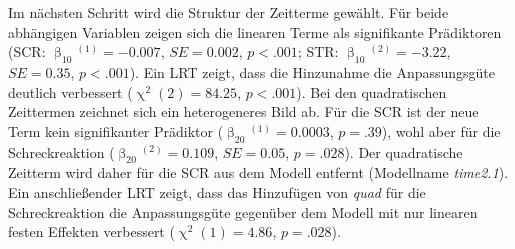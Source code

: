 		
			Im nächsten Schritt wird die Struktur der Zeitterme gewählt. 
			Für beide abhängigen Variablen zeigen sich die linearen Terme als signifikante Prädiktoren (SCR: $\upbeta_{10}{}^{(1)}=-0.007$, $SE=0.002$, $p<.001$; STR: $\upbeta_{10}{}^{(2)}=-3.22$, $SE=0.35$, $p<.001$). Ein LRT zeigt, dass die Hinzunahme die Anpassungsgüte deutlich verbessert ($\upchi^2(2)=84.25$, $p<.001$). 
			Bei den quadratischen Zeittermen zeichnet sich ein heterogeneres Bild ab. Für die SCR ist der neue Term kein signifikanter Prädiktor ($\upbeta_{20}{}^{(1)}=0.0003$,  $p=.39$), wohl aber für die Schreckreaktion ($\upbeta_{20}{}^{(2)}=0.109$,  $SE=0.05$, $p=.028$). 
			Der quadratische Zeitterm wird daher für die SCR aus dem Modell entfernt (Modellname \textit{time2.1}).
			Ein anschließender LRT zeigt, dass das Hinzufügen von \textit{quad} für die Schreckreaktion die Anpassungsgüte gegenüber dem Modell mit nur linearen festen Effekten verbessert ($\upchi^2(1)=4.86$, $p=.028$).
			
